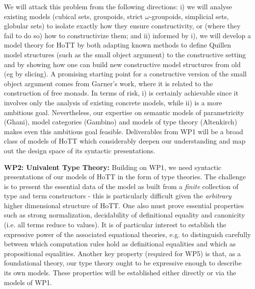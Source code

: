 \documentclass[a4paper,11pt]{article}
\begin{document}

We will attack this problem from the following directions: i) we will
analyse existing models (cubical sets, groupoids, strict
$\omega$-groupoids, simplicial sets, globular sets) to isolate exactly
how they ensure constructivity, or (where they fail to do so) how to 
constructivize them; and ii) informed by i),
we will develop a model theory for HoTT by both adapting known methods to
define Quillen model structures (such as the small object argument)
to the constructive setting and by showing how one can build  new
constructive model structures from old (eg by
slicing). A promising starting point for a constructive
version of the small object argument comes from Garner's work, where
it is related to the construction of free monads. In terms of risk,
i) is certainly achievable since it involves only the analysis of
existing concrete models, while ii) is a more ambitious
goal. Nevertheless, our expertise on semantic models of parametricity (Ghani), model
categories (Gambino) and models of type theory (Altenkirch) makes even this
ambitious goal feasible. Deliverables from WP1 will be a broad class
of models of HoTT which considerably deepen our
understanding and map out the design space of its 
syntactic presentations.




{\bf WP2: Univalent Type Theory:} Building on WP1, we need syntactic
presentations of our models of HoTT in the form of type theories. The
challenge is to present the essential data of the model as built from
a {\em finite} collection of type and term constructors - this is
particularly difficult given the {\em arbitrary} higher dimensional
structure of HoTT. One also must prove essential properties such as strong normalization, decidability of
definitional equality and canonicity (i.e. all terms reduce to
values). It is of particular interest to establish the expressive
power of the associated equational theories, e.g. to distinguish
carefully between which computation rules hold as definitional
equalities and which as propositional equalities. Another key property
(required for WP5) is that, as a foundational theory, our type theory
ought to be expressive enough to describe its own models. These
properties will be established either directly or via the models of
WP1.
\end{document}

